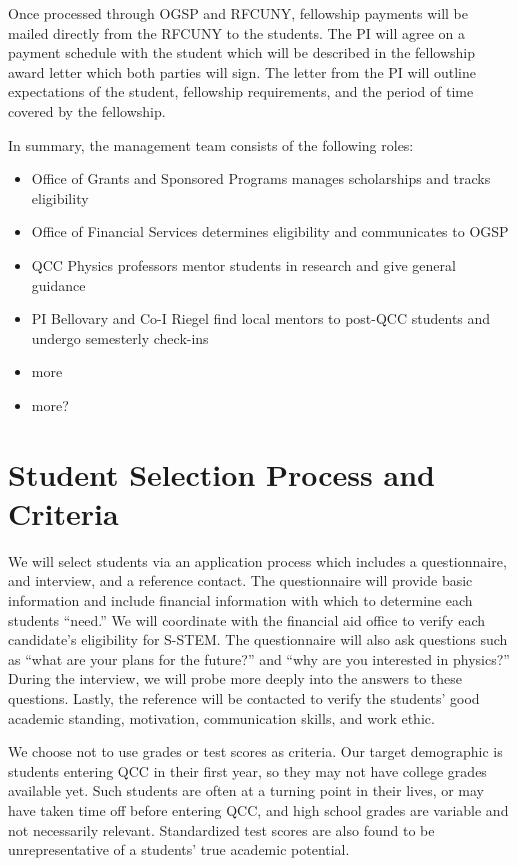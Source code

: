 \documentclass[12pt]{article}
\begin{document}
Once processed through OGSP and RFCUNY, fellowship payments will be mailed directly from the RFCUNY to the students.  The PI will agree on a payment schedule with the student which will be described in the fellowship award letter which both parties will sign.  The letter from the PI will outline expectations of the student, fellowship requirements, and the period of time covered by the fellowship. 

In summary, the management team consists of the following roles:
\begin{itemize}
\setlength{\itemsep}{-\parsep}
\setlength{\topsep}{-\parsep}
\setlength{\partopsep}{-\parsep}
	\item Office of Grants and Sponsored Programs  manages scholarships and tracks eligibility
	\item Office of Financial Services determines eligibility and communicates to OGSP
	\item QCC Physics professors mentor students in research and give general guidance
	\item PI Bellovary and Co-I Riegel find local mentors to post-QCC students and undergo semesterly check-ins
	\item more
	\item more?
\end{itemize}	

\section{Student Selection Process and Criteria}
We will select students via an application process which includes a questionnaire, and interview, and a reference contact.  The questionnaire will provide basic information and include financial information with which to determine each students ``need.''  We will coordinate with the financial aid office to verify each candidate's eligibility for S-STEM.  The questionnaire will also ask questions such as ``what are your plans for the future?'' and ``why are you interested in physics?''  During the interview, we will probe more deeply into the answers to these questions.  Lastly, the reference will be contacted to verify the students' good academic standing, motivation, communication skills, and work ethic.

We choose not to use grades or test scores as criteria.  Our target demographic is students entering QCC in their first year, so they may not have college grades available yet.  Such students are often at a turning point in their lives, or may have taken time off before entering QCC, and high school grades are variable and not necessarily relevant.  Standardized test scores are also found to be unrepresentative of a students' true academic potential.
\end{document}

